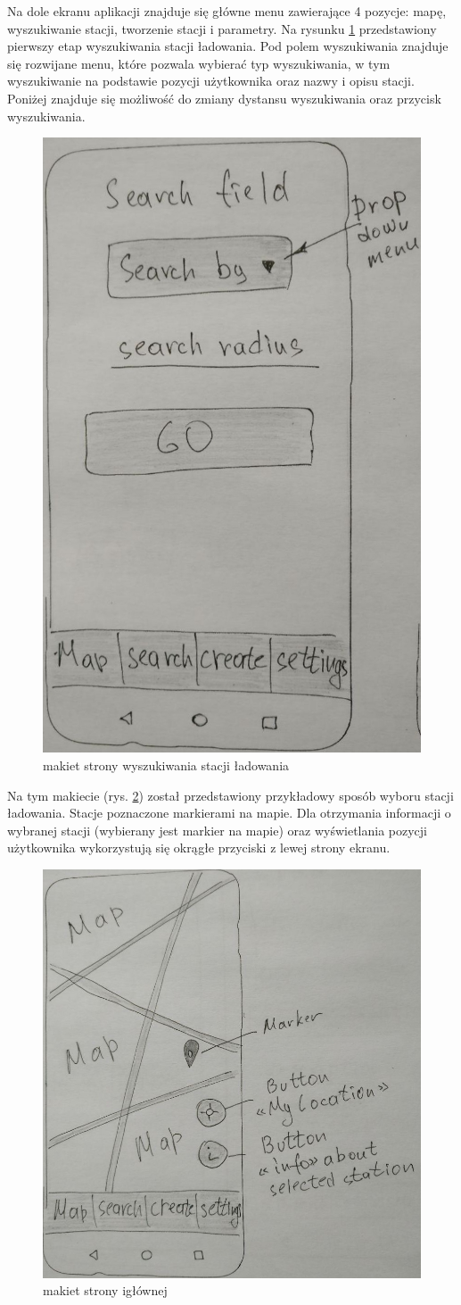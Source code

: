 Na dole ekranu aplikacji znajduje się główne menu zawierające 4 pozycje: mapę, wyszukiwanie stacji, tworzenie stacji i parametry.
Na rysunku \ref{fig:search_makiet} przedstawiony pierwszy etap wyszukiwania stacji ładowania.
Pod polem wyszukiwania znajduje się rozwijane menu, które pozwala wybierać typ wyszukiwania, w tym wyszukiwanie na podstawie pozycji użytkownika oraz nazwy i opisu stacji.
Poniżej znajduje się możliwość do zmiany dystansu wyszukiwania oraz przycisk wyszukiwania.
\begin{figure}[ht]
    \centering
        \includegraphics[width=0.4\linewidth]{rys02/search_makiet.jpg}
        \caption{makiet strony wyszukiwania stacji ładowania}
    \label{fig:search_makiet}
\end{figure}
\newpage
Na tym makiecie (rys. \ref{fig:main_makiet}) został przedstawiony przykładowy sposób wyboru stacji ładowania. Stacje poznaczone markierami na mapie. Dla otrzymania informacji o wybranej stacji (wybierany jest markier na mapie) oraz wyświetlania pozycji użytkownika wykorzystują się okrągłe przyciski z lewej strony ekranu.
\begin{figure}[ht]
    \centering
        \includegraphics[width=0.5\linewidth]{rys02/main_makiet.jpg}
        \caption{makiet strony igłównej}
    \label{fig:main_makiet}
\end{figure}

